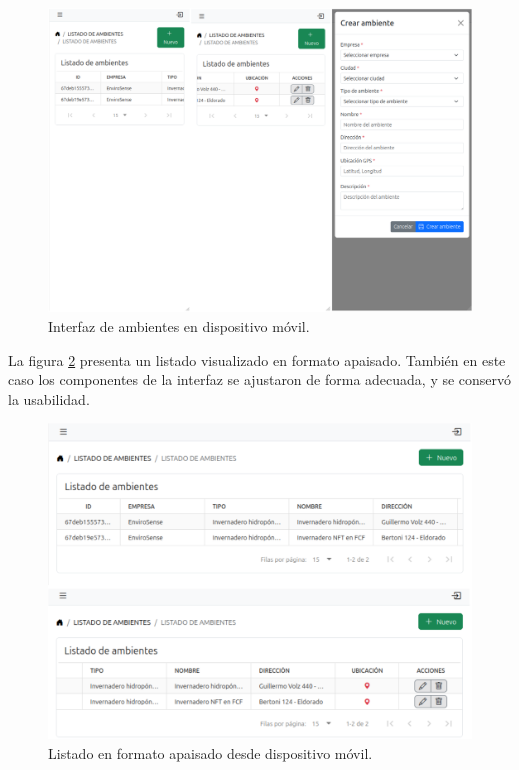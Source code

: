 \begin{figure}[H]
    \centering
    \includegraphics[width=\textwidth]{Images/49_responsive.png}
    \caption[Interfaz de ambientes en dispositivo móvil]{Interfaz de ambientes en dispositivo móvil.}
    \label{fig:responsive1}
\end{figure}

La figura \ref{fig:responsive2} presenta un listado visualizado en formato
apaisado. También en este caso los componentes de la interfaz se ajustaron de
forma adecuada, y se conservó la usabilidad.

\begin{figure}[H]
    \centering
    \includegraphics[width=\textwidth]{Images/50_responsive.png}
    \caption[Listado en formato apaisado desde dispositivo móvil]{Listado en formato apaisado desde dispositivo móvil.}
    \label{fig:responsive2}
\end{figure}

